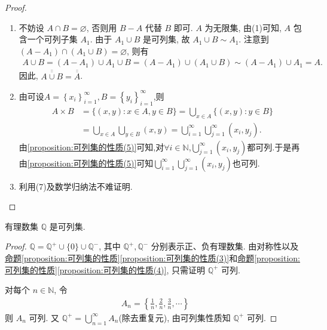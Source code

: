 \documentclass[../../main.tex]{subfiles}
\begin{document}
\begin{proof}
\begin{enumerate}[(1)]
\item 不妨设 $A \cap B = \varnothing$, 否则用 $B - A$ 代替 $B$ 即可. $A$ 为无限集, 由(1)可知, $A$ 包含一个可列子集 $A_1$. 由于 $A_1 \cup B$ 是可列集, 故 $A_1 \cup B \sim A_1$. 注意到 $(A - A_1) \cap (A_1 \cup B) = \varnothing$, 则有
\begin{align*}
A \cup B = (A - A_1) \cup A_1 \cup B
= (A - A_1) \cup (A_1 \cup B) \sim (A - A_1) \cup A_1 = A.
\end{align*}
因此, $\overline{\overline{A \cup B}} = \overline{\overline{A}}$. 

\item 由可设$A=\left\{ x_i \right\} _{i=1}^{\infty},B=\left\{ y_i \right\} _{i=1}^{\infty}$,则
\begin{align*}
A\times B&=\{(x,y):x\in A,y\in B\}=\bigcup_{x\in A}{\{(x,y):y}\in B\}
\\
&=\bigcup_{x\in A}{\bigcup_{y\in B}{\left( x,y \right)}}=\bigcup_{i=1}^{\infty}{\bigcup_{j=1}^{\infty}{\left( x_i,y_j \right)}}.
\end{align*}
由\ref{proposition:可列集的性质(5)}可知,对$\forall i\in \mathbb{N}$,$\bigcup_{j=1}^{\infty}{\left( x_i,y_j \right)}$都可列.于是再由\ref{proposition:可列集的性质(5)}可知$\bigcup_{i=1}^{\infty}{\bigcup_{j=1}^{\infty}{\left( x_i,y_j \right)}}$也可列.

\item 利用(7)及数学归纳法不难证明.
\end{enumerate}
\end{proof}

\begin{example}
有理数集 $\mathbb{Q}$ 是可列集.
\end{example}
\begin{proof}
$\mathbb{Q} = \mathbb{Q}^+ \cup \{0\} \cup \mathbb{Q}^-$, 其中 $\mathbb{Q}^+, \mathbb{Q}^-$ 分别表示正、负有理数集. 由对称性以及\hyperref[proposition:可列集的性质(3)]{命题\ref{proposition:可列集的性质}\ref{proposition:可列集的性质(3)}}和\hyperref[proposition:可列集的性质(4)]{命题\ref{proposition:可列集的性质}\ref{proposition:可列集的性质(4)}}, 只需证明 $\mathbb{Q}^+$ 可列.

对每个 $n \in \mathbb{N}$, 令
\begin{align*}
A_n = \left\{\frac{1}{n}, \frac{2}{n}, \frac{3}{n}, \cdots\right\}
\end{align*}
则 $A_n$ 可列. 又 $\mathbb{Q}^+ = \bigcup_{n = 1}^{\infty} A_n$(除去重复元), 由可列集性质知 $\mathbb{Q}^+$ 可列.
\end{proof}
\end{document}
